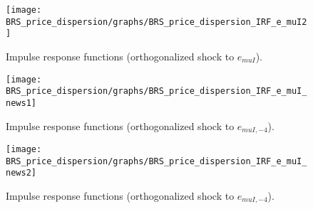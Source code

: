 \begin{figure}[H]
\centering 
\texttt{[image: BRS\_price\_dispersion/graphs/BRS\_price\_dispersion\_IRF\_e\_muI2]}
\caption{Impulse response functions (orthogonalized shock to ${e_{muI}}$).}\label{Fig:IRF:e_muI:2}
\end{figure}
 
\begin{figure}[H]
\centering 
\texttt{[image: BRS\_price\_dispersion/graphs/BRS\_price\_dispersion\_IRF\_e\_muI\_news1]}
\caption{Impulse response functions (orthogonalized shock to ${e_{muI,-4}}$).}\label{Fig:IRF:e_muI_news:1}
\end{figure}
 
\begin{figure}[H]
\centering 
\texttt{[image: BRS\_price\_dispersion/graphs/BRS\_price\_dispersion\_IRF\_e\_muI\_news2]}
\caption{Impulse response functions (orthogonalized shock to ${e_{muI,-4}}$).}\label{Fig:IRF:e_muI_news:2}
\end{figure}
 
 
